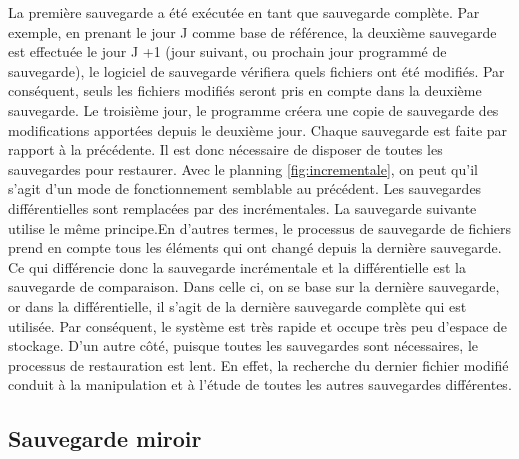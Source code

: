 \documentclass[pfe]{tnreport} %
\begin{document}
La première sauvegarde a été exécutée en tant que sauvegarde complète. Par exemple, en prenant le jour J comme base de référence, la deuxième sauvegarde est effectuée le jour J +1 (jour suivant, ou prochain jour programmé de sauvegarde), le logiciel de sauvegarde vérifiera quels fichiers ont été modifiés. \newline Par conséquent, seuls les fichiers modifiés seront pris en compte dans la deuxième sauvegarde. 
Le troisième jour, le programme créera une copie de sauvegarde des modifications apportées depuis le deuxième jour. \newline
Chaque sauvegarde est faite par rapport à la précédente. Il est donc nécessaire de disposer de toutes les sauvegardes pour restaurer.\newline
Avec le planning \ref{fig:incrementale}, on peut qu'il s'agit d'un mode de fonctionnement semblable au précédent. Les sauvegardes différentielles sont remplacées par des incrémentales. \newline
La sauvegarde suivante utilise le même principe.\newline En d'autres termes, le processus de sauvegarde de fichiers prend en compte tous les éléments qui ont changé depuis la dernière sauvegarde. \newline
Ce qui différencie donc la sauvegarde incrémentale et la différentielle est la sauvegarde de comparaison. Dans celle ci, on se base sur la dernière sauvegarde, or dans la différentielle, il s'agit de la dernière sauvegarde complète qui est utilisée. \newline
Par conséquent, le système est très rapide et occupe très peu d'espace de stockage. \newline
D'un autre côté, puisque toutes les sauvegardes sont nécessaires, le processus de restauration est lent. En effet, la recherche du dernier fichier modifié conduit à la manipulation et à l'étude de toutes les autres sauvegardes différentes.
\subsection{Sauvegarde miroir}
\end{document}
